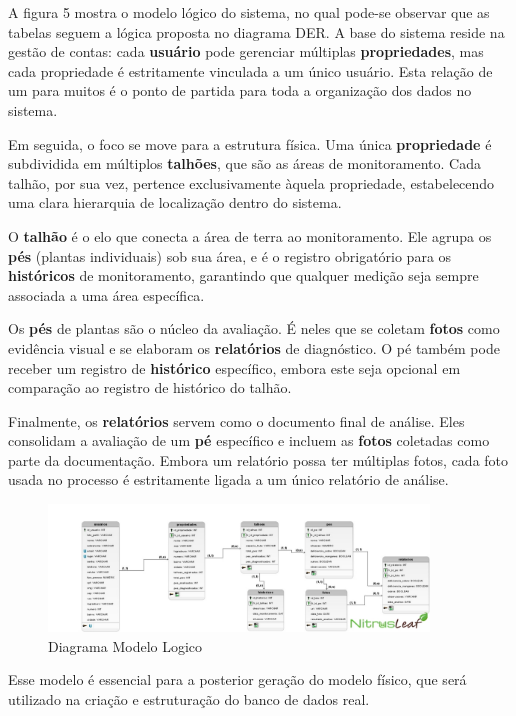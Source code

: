 
\medskip
A figura 5 mostra o modelo lógico do sistema, no qual pode-se observar que as tabelas seguem a 
lógica proposta no diagrama DER. A base do sistema reside na gestão de contas: cada \textbf{usuário} 
pode gerenciar múltiplas 
\textbf{propriedades}, mas cada propriedade é estritamente vinculada a um único usuário. Esta relação 
de um para muitos é o ponto de partida para toda a organização dos dados no sistema.

\medskip
Em seguida, o foco se move para a estrutura física. Uma única \textbf{propriedade} é subdividida 
em múltiplos \textbf{talhões}, que são as áreas de monitoramento. Cada talhão, por sua vez, pertence 
exclusivamente àquela propriedade, estabelecendo uma clara hierarquia de localização dentro do sistema.

\medskip
O \textbf{talhão} é o elo que conecta a área de terra ao monitoramento. Ele agrupa os \textbf{pés} 
(plantas individuais) sob sua área, e é o registro obrigatório para os \textbf{históricos} de 
monitoramento, garantindo que qualquer medição seja sempre associada a uma área específica.

\medskip
Os \textbf{pés} de plantas são o núcleo da avaliação. É neles que se coletam \textbf{fotos} como
evidência visual e se elaboram os \textbf{relatórios} de diagnóstico. O pé também pode receber um 
registro de \textbf{histórico} específico, embora este seja opcional em comparação ao registro de 
histórico do talhão.

\medskip
Finalmente, os \textbf{relatórios} servem como o documento final de análise. Eles consolidam a 
avaliação de um \textbf{pé} específico e incluem as \textbf{fotos} coletadas como parte da documentação. 
Embora um relatório possa ter múltiplas fotos, cada foto usada no processo é estritamente ligada a um 
único relatório de análise.

\medskip
\begin{figure}[H]
\centering
\caption{Diagrama Modelo Logico}
\label{fig:diagrama-mer}
\includegraphics[width=0.9\textwidth]{Images/DiagramaMER.jpg}
\end{figure}

Esse modelo é essencial para a posterior geração do modelo físico, que será
utilizado na criação e estruturação do banco de dados real.
\medskip